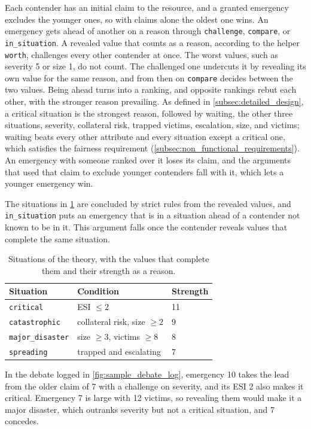 Each contender has an initial claim to the resource, and a granted emergency excludes the younger ones, so with claims alone the oldest one wins.
An emergency gets ahead of another on a reason through \texttt{challenge}, \texttt{compare}, or \texttt{in\_situation}.
A revealed value that counts as a reason, according to the helper \texttt{worth}, challenges every other contender at once.
The worst values, such as severity 5 or size 1, do not count.
The challenged one undercuts it by revealing its own value for the same reason, and from then on \texttt{compare} decides between the two values.
Being ahead turns into a ranking, and opposite rankings rebut each other, with the stronger reason prevailing.
As defined in \cref{subsec:detailed_design}, a critical situation is the strongest reason, followed by waiting, the other three situations, severity, collateral risk, trapped victims, escalation, size, and victims; waiting beats every other attribute and every situation except a critical one, which satisfies the fairness requirement (\cref{subsec:non_functional_requirements}).
An emergency with someone ranked over it loses its claim, and the arguments that used that claim to exclude younger contenders fall with it, which lets a younger emergency win.

The situations in \cref{tab:impl_situations} are concluded by strict rules from the revealed values, and \texttt{in\_situation} puts an emergency that is in a situation ahead of a contender not known to be in it.
This argument falls once the contender reveals values that complete the same situation.
\begin{table}[htbp]
\centering
\small
\begin{tabular}{|l|l|l|}
\hline
\textbf{Situation} & \textbf{Condition} & \textbf{Strength} \\
\hline
\texttt{critical} & ESI $\le 2$ & 11 \\
\texttt{catastrophic} & collateral risk, size $\ge 2$ & 9 \\
\texttt{major\_disaster} & size $\ge 3$, victims $\ge 8$ & 8 \\
\texttt{spreading} & trapped and escalating & 7 \\
\hline
\end{tabular}
\caption{Situations of the theory, with the values that complete them and their strength as a reason.}
\label{tab:impl_situations}
\end{table}

In the debate logged in \cref{fig:sample_debate_log}, emergency 10 takes the lead from the older claim of 7 with a challenge on severity, and its ESI 2 also makes it critical.
Emergency 7 is large with 12 victims, so revealing them would make it a major disaster, which outranks severity but not a critical situation, and 7 concedes.

